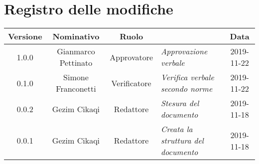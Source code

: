 \section*{Registro delle modifiche}
\renewcommand{\arraystretch}{1.8}
  
  \begin{longtable}{|c|c|c|p{3.8cm}|c|}
    \hline
    
    \rowcolor{header}
    \textbf{Versione} & \textbf{Nominativo} & \textbf{Ruolo} & \centering{\textbf{Descrizione}} & \textbf{Data}\\
    
    \hline
    
    1.0.0 & Gianmarco Pettinato & Approvatore & \small{\textit{Approvazione verbale}} & 2019-11-22\\
    0.1.0 & Simone Franconetti & Verificatore & \small{\textit{Verifica verbale secondo norme}} & 2019-11-22\\
    0.0.2 & Gezim Cikaqi & Redattore & \small{\textit{Stesura del documento}} & 2019-11-18\\
    0.0.1 & Gezim Cikaqi & Redattore & \small{\textit{Creata la struttura del documento}} & 2019-11-18\\
    
    \hline
  \end{longtable}